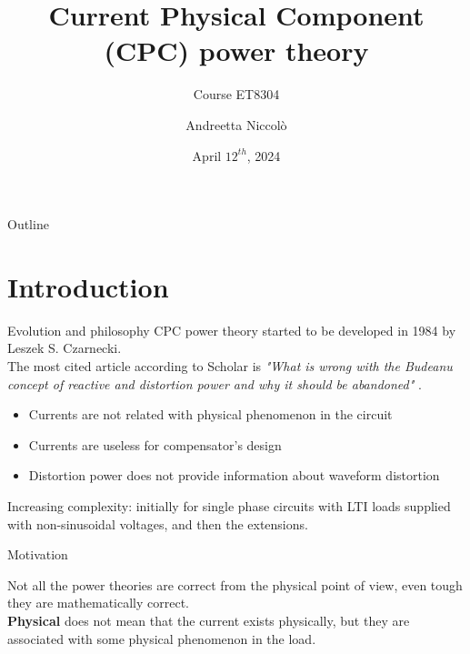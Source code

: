 \documentclass[aspectratio=169]{beamer}
\title{Current Physical Component (CPC) power theory}
\subtitle{Course ET8304}
\author{Andreetta Niccolò}
\date{April $12^{th}$, 2024}
\begin{document}
  \maketitle

  \begin{frame}[fragile]{Outline}
    \tableofcontents
  \end{frame}

  \section{Introduction}
  \begin{frame}{Evolution and philosophy}{\insertsection}
        CPC power theory started to be developed in \textcolor{NTNU_orange}{1984} by Leszek S. Czarnecki.\\
        The most cited article according to Scholar is \textit{"What is wrong with the Budeanu concept of reactive and distortion power and why it should be abandoned"} \cite{6312797}.
        \begin{itemize}
            \item Currents are not related with physical phenomenon in the circuit
            \item Currents are useless for compensator's design
            \item Distortion power does not provide information about waveform distortion
        \end{itemize}
        \textcolor{NTNU_orange}{Increasing complexity}: initially for single phase circuits with LTI loads supplied with non-sinusoidal voltages, and then the extensions.\\
        
  \end{frame}

  \begin{frame}[fragile]{Motivation}{\insertsection}        
    \begin{figure}
    \end{figure}

      Not all the power theories are correct from the physical point of view, even tough they are mathematically correct.\\

      \textbf{Physical} does not mean that the current exists physically, but they are associated with some physical phenomenon in the load. 
      
  \end{frame}
\end{document}
